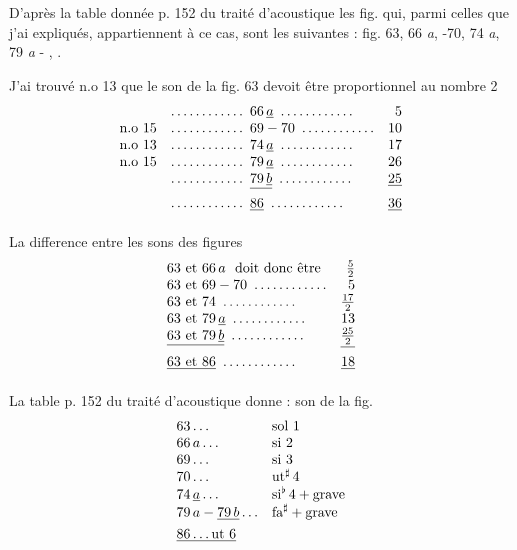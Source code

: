 \documentclass[11pt,a4paper]{article}
\begin{document}
D'après la table donnée p. 152 du traité d'acoustique les fig. qui, parmi celles que j'ai
expliqués, appartiennent à ce cas, sont les suivantes : fig. 63, 66 \emph{a}, -70, 74 \emph{a},
79 \emph{a} - , .

J'ai trouvé n.o 13 que le son de la fig. 63 devoit être proportionnel au nombre 2
\[
\begin{array}{llr}
 & \ldots\ldots\ldots\ldots\ 66\,\underline{a}\ \ldots\ldots\ldots\ldots & 5\\
\text{n.o }15 & \ldots\ldots\ldots\ldots\ 69-70\ \ldots\ldots\ldots\ldots & 10\\
\text{n.o }13 & \ldots\ldots\ldots\ldots\ 74\,\underline{a}\ \ldots\ldots\ldots\ldots & 17\\
\text{n.o }15 & \ldots\ldots\ldots\ldots\ 79\,\underline{a}\ \ldots\ldots\ldots\ldots & 26\\
 & \ldots\ldots\ldots\ldots\ \struck{79\,\underline{b}}\ \ldots\ldots\ldots\ldots & \struck{25}\\
 & \ldots\ldots\ldots\ldots\ \struck{86}\ \ldots\ldots\ldots\ldots & \struck{36}
\end{array}
\]

La difference entre les sons des figures
\[
\begin{array}{lr}
63 \text{ et } 66\,a \ \text{ doit donc être} & \frac{5}{2}\\
63 \text{ et } 69-70\ \ldots\ldots\ldots\ldots & 5\\
63 \text{ et } 74\ \ldots\ldots\ldots\ldots & \frac{17}{2}\\
63 \text{ et } 79\,\underline{a}\ \ldots\ldots\ldots\ldots & 13\\
\struck{63 \text{ et } 79\,\underline{b}}\ \ldots\ldots\ldots\ldots & \struck{\frac{25}{2}}\\
\struck{63 \text{ et } 86}\ \ldots\ldots\ldots\ldots & \struck{18}
\end{array}
\]

La table p. 152 du traité d'acoustique donne : son de la fig.
\[
\begin{array}{ll}
63 \ldots & \text{sol }1\\
66\,a \ldots & \text{si }2\\
69 \ldots & \text{si }3\\
70 \ldots & \text{ut}^{\sharp}\,4\\
74\,\underline{a} \ldots & \text{si}^{\flat}\,4 + \text{grave}\\
79\,a - \struck{79\,b} \ldots & \text{fa}^{\sharp} + \text{grave}\\
\struck{86 \ldots \text{ut }6} &
\end{array}
\]
\end{document}
